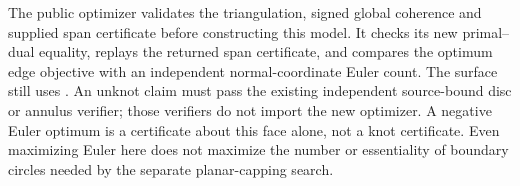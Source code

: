 The public optimizer validates the triangulation, signed global coherence
and supplied span certificate before constructing this model. It checks its
new primal--dual equality, replays the returned span certificate, and compares
the optimum edge objective with an independent normal-coordinate Euler count.
The surface still uses . An unknot claim must
pass the existing independent source-bound disc or annulus verifier; those
verifiers do not import the new optimizer. A negative Euler optimum is a
certificate about this face alone, not a knot certificate. Even maximizing
Euler here does not maximize the number or essentiality of boundary circles
needed by the separate planar-capping search.


